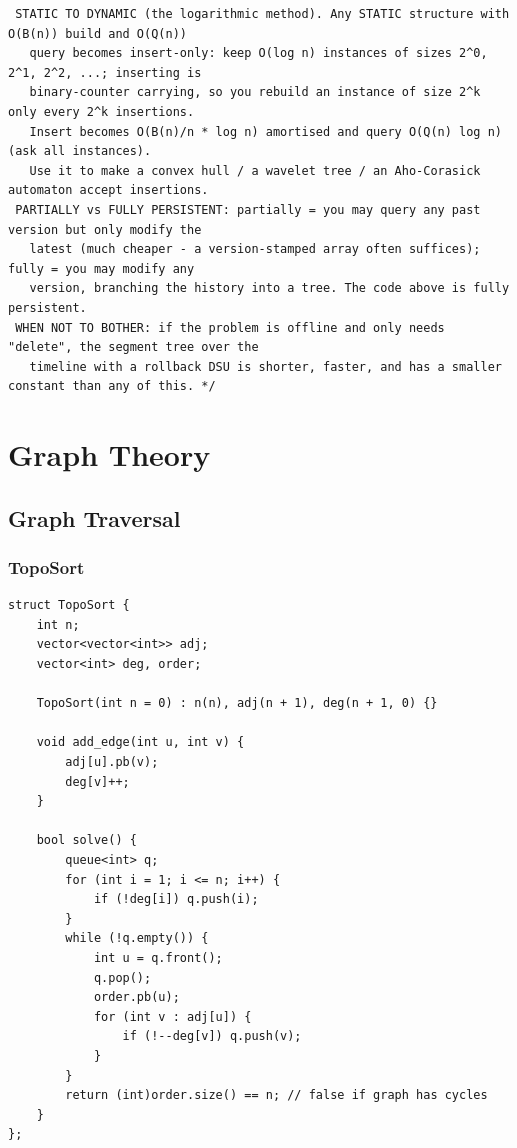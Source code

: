 \documentclass[9pt,a4paper,twocolumn]{extarticle}
\begin{document}
\begin{lstlisting}
 STATIC TO DYNAMIC (the logarithmic method). Any STATIC structure with O(B(n)) build and O(Q(n))
   query becomes insert-only: keep O(log n) instances of sizes 2^0, 2^1, 2^2, ...; inserting is
   binary-counter carrying, so you rebuild an instance of size 2^k only every 2^k insertions.
   Insert becomes O(B(n)/n * log n) amortised and query O(Q(n) log n) (ask all instances).
   Use it to make a convex hull / a wavelet tree / an Aho-Corasick automaton accept insertions.
 PARTIALLY vs FULLY PERSISTENT: partially = you may query any past version but only modify the
   latest (much cheaper - a version-stamped array often suffices); fully = you may modify any
   version, branching the history into a tree. The code above is fully persistent.
 WHEN NOT TO BOTHER: if the problem is offline and only needs "delete", the segment tree over the
   timeline with a rollback DSU is shorter, faster, and has a smaller constant than any of this. */
\end{lstlisting}

\section{Graph Theory}

\subsection{Graph Traversal}

\filbreak
\subsubsection{TopoSort}
\nopagebreak
\begin{lstlisting}
struct TopoSort {
    int n;
    vector<vector<int>> adj;
    vector<int> deg, order;

    TopoSort(int n = 0) : n(n), adj(n + 1), deg(n + 1, 0) {}

    void add_edge(int u, int v) {
        adj[u].pb(v);
        deg[v]++;
    }

    bool solve() {
        queue<int> q;
        for (int i = 1; i <= n; i++) {
            if (!deg[i]) q.push(i);
        }
        while (!q.empty()) {
            int u = q.front();
            q.pop();
            order.pb(u);
            for (int v : adj[u]) {
                if (!--deg[v]) q.push(v);
            }
        }
        return (int)order.size() == n; // false if graph has cycles
    }
};
\end{lstlisting}
\end{document}
